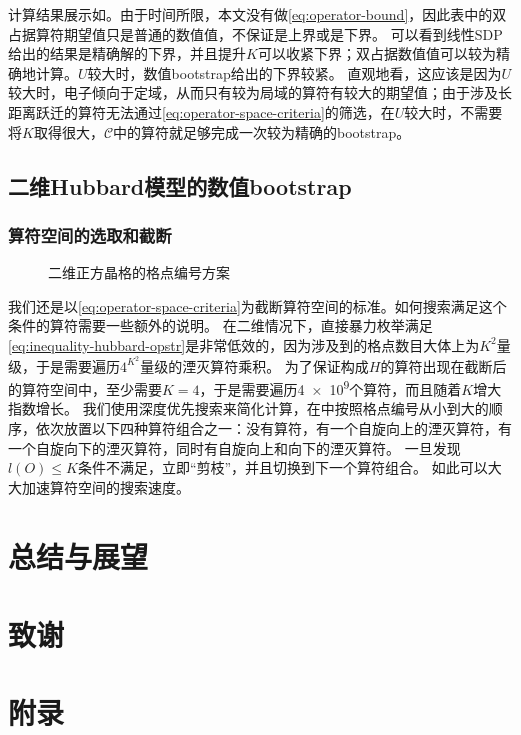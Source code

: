 \documentclass[oneside]{fduthesis}
\begin{document}


计算结果展示如。由于时间所限，本文没有做\eqref{eq:operator-bound}，因此表中的双占据算符期望值只是普通的数值值，不保证是上界或是下界。
可以看到线性SDP给出的结果是精确解的下界，并且提升$K$可以收紧下界；双占据数值值可以较为精确地计算。$U$较大时，数值bootstrap给出的下界较紧。
直观地看，这应该是因为$U$较大时，电子倾向于定域，从而只有较为局域的算符有较大的期望值；由于涉及长距离跃迁的算符无法通过\eqref{eq:operator-space-criteria}的筛选，在$U$较大时，不需要将$K$取得很大，$\mathcal{C}$中的算符就足够完成一次较为精确的bootstrap。

\section{二维Hubbard模型的数值bootstrap}

\subsection{算符空间的选取和截断}

\begin{figure}
    \centering
    
    \caption{二维正方晶格的格点编号方案}
    \label{fig:site-index-2d}
\end{figure}

我们还是以\eqref{eq:operator-space-criteria}为截断算符空间的标准。如何搜索满足这个条件的算符需要一些额外的说明。
在二维情况下，直接暴力枚举满足\eqref{eq:inequality-hubbard-opstr}是非常低效的，因为涉及到的格点数目大体上为$K^2$量级，于是需要遍历$4^{K^2}$量级的湮灭算符乘积。
为了保证构成$H$的算符出现在截断后的算符空间中，至少需要$K=4$，于是需要遍历\num{4e9}个算符，而且随着$K$增大指数增长。
我们使用深度优先搜索来简化计算，在中按照格点编号从小到大的顺序，依次放置以下四种算符组合之一：没有算符，有一个自旋向上的湮灭算符，有一个自旋向下的湮灭算符，同时有自旋向上和向下的湮灭算符。
一旦发现$l(O) \leq K$条件不满足，立即“剪枝”，并且切换到下一个算符组合。
如此可以大大加速算符空间的搜索速度。

\chapter{总结与展望}


\backmatter

\printbibliography

\chapter{致\quad 谢}

\chapter{附\quad 录}
\end{document}
